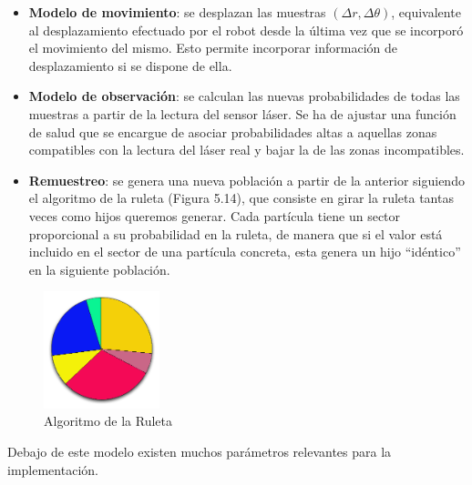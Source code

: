 \begin{itemize}
	\item \textbf{ Modelo de movimiento}: se desplazan las muestras $(\Delta r, \Delta\theta)$, equivalente al desplazamiento efectuado por el robot desde la última vez que se incorporó el movimiento del mismo. Esto permite incorporar información de desplazamiento si se dispone de ella. 
	\item \textbf{Modelo de observación}: se calculan las nuevas probabilidades de todas las muestras a partir de la lectura del sensor láser. Se ha de ajustar una función de salud que se encargue de asociar probabilidades altas a aquellas zonas compatibles con la lectura del láser real y bajar la de las zonas incompatibles. 
	\item \textbf{Remuestreo}: se genera una nueva población a partir de la anterior siguiendo el algoritmo de la ruleta (Figura 5.14), que consiste en girar la ruleta tantas veces como hijos queremos generar. Cada partícula tiene un sector proporcional a su probabilidad en la ruleta, de manera que si el valor está incluido en el sector de una partícula concreta, esta genera un hijo “idéntico” en la siguiente población.
\end{itemize}

\begin{figure}[H]
	\begin{center}
		\includegraphics[width=0.3\textwidth]{figures/ruleta.png}
		\caption{Algoritmo de la Ruleta}
		\label{fig.ruleta}
		\end{center}
\end{figure}

Debajo de este modelo existen muchos parámetros relevantes para la implementación.

